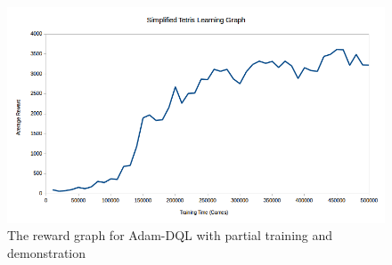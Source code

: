     \begin{figure}[H]
        \centering
        \includegraphics[scale=0.5]{images/tetrisreward3.png}
        \caption{The reward graph for Adam-DQL with partial training and demonstration}
        \label{fig:tetris3}
    \end{figure}    
    
